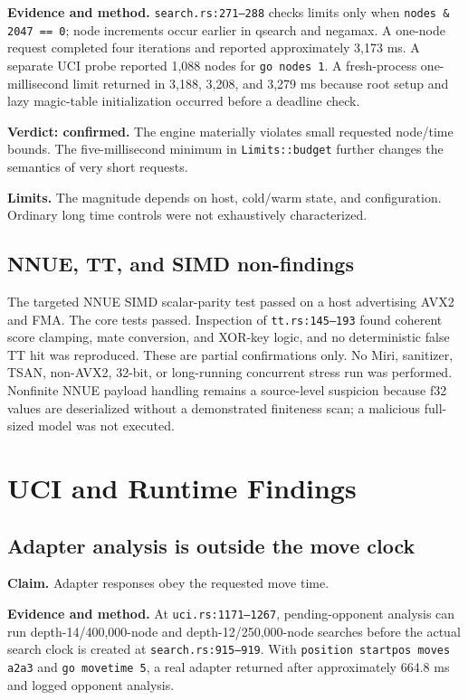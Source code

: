 \documentclass[conference]{IEEEtran}
\newcommand{\code}[1]{\texttt{\small #1}}
\begin{document}
\textbf{Evidence and method.} \code{search.rs:271--288} checks limits only when \code{nodes \& 2047 == 0}; node increments occur earlier in qsearch and negamax. A one-node request completed four iterations and reported approximately 3,173 ms. A separate UCI probe reported 1,088 nodes for \code{go nodes 1}. A fresh-process one-millisecond limit returned in 3,188, 3,208, and 3,279 ms because root setup and lazy magic-table initialization occurred before a deadline check.

\textbf{Verdict: confirmed.} The engine materially violates small requested node/time bounds. The five-millisecond minimum in \code{Limits::budget} further changes the semantics of very short requests.

\textbf{Limits.} The magnitude depends on host, cold/warm state, and configuration. Ordinary long time controls were not exhaustively characterized.

\subsection{NNUE, TT, and SIMD non-findings}
The targeted NNUE SIMD scalar-parity test passed on a host advertising AVX2 and FMA. The core tests passed. Inspection of \code{tt.rs:145--193} found coherent score clamping, mate conversion, and XOR-key logic, and no deterministic false TT hit was reproduced. These are partial confirmations only. No Miri, sanitizer, TSAN, non-AVX2, 32-bit, or long-running concurrent stress run was performed. Nonfinite NNUE payload handling remains a source-level suspicion because f32 values are deserialized without a demonstrated finiteness scan; a malicious full-sized model was not executed.

\section{UCI and Runtime Findings}
\subsection{Adapter analysis is outside the move clock}
\textbf{Claim.} Adapter responses obey the requested move time.

\textbf{Evidence and method.} At \code{uci.rs:1171--1267}, pending-opponent analysis can run depth-14/400,000-node and depth-12/250,000-node searches before the actual search clock is created at \code{search.rs:915--919}. With \code{position startpos moves a2a3} and \code{go movetime 5}, a real adapter returned after approximately 664.8 ms and logged opponent analysis.
\end{document}
